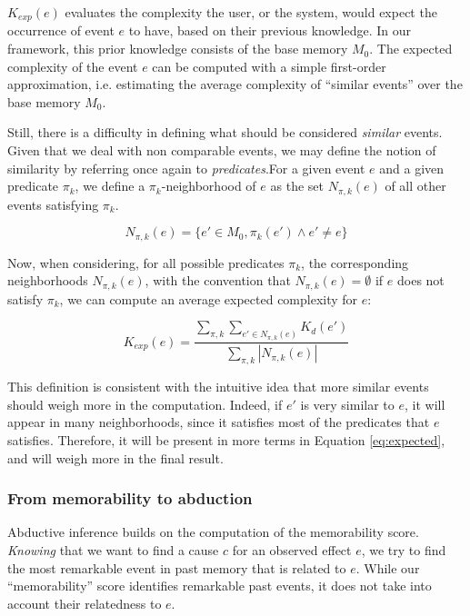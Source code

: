 \documentclass[entropy,article,submit,moreauthors,pdftex]{Definitions/mdpi}
\begin{document}
$K_{exp}(e)$ evaluates the complexity the user, or the system, would expect the occurrence of event $e$ to have, based on their previous knowledge. In our framework, this prior knowledge consists of the base memory $M_0$. The expected complexity of the event $e$ can be computed with a simple first-order approximation, i.e. estimating the average complexity of ``similar events'' over the base memory $M_0$.

Still, there is a difficulty in defining what
should be considered \emph{similar} events. Given that we deal with non comparable events, we may define the notion of similarity by referring once again to \emph{predicates}.For a given event $e$ and a given predicate $\pi_k$, we define a $\pi_k$-neighborhood of $e$ as the set $N_{\pi, k}(e)$ of all other events satisfying $\pi_k$.

\begin{equation}
    \label{eq:similar}
    N_{\pi, k}(e) = \{e'\in M_0, \pi_k(e') \wedge e' \neq e\}
\end{equation}

Now, when considering, for all possible predicates $\pi_k$, the corresponding
neighborhoods $N_{\pi, k}(e)$, with the convention that $N_{\pi, k}(e) = \emptyset$
if $e$ does not satisfy $\pi_k$, we can compute an average expected complexity for $e$:

\begin{equation}
    \label{eq:expected}
    K_{exp}(e) = \frac{
    \sum_{\pi, k} \sum_{e' \in N_{\pi, k}(e)} K_d(e')
    }{
    \sum_{\pi, k} |N_{\pi, k}(e)|
    }
\end{equation}

This definition is consistent with the intuitive idea that more similar events should weigh more in the computation. Indeed, if $e'$
is very similar to $e$, it will appear in many neighborhoods, since it
satisfies most of the predicates that $e$ satisfies. Therefore, it will
be present in more terms in Equation \ref{eq:expected}, and will weigh more in
the final result.

\subsubsection{From memorability to abduction}
Abductive inference builds on the computation
of the memorability score. \emph{Knowing} that we want to find a cause $c$
for an observed effect $e$, we try to find the most remarkable event in past
memory that is related to $e$. While our ``memorability'' score identifies remarkable past events, it does not take into account their relatedness to $e$.
\end{document}

